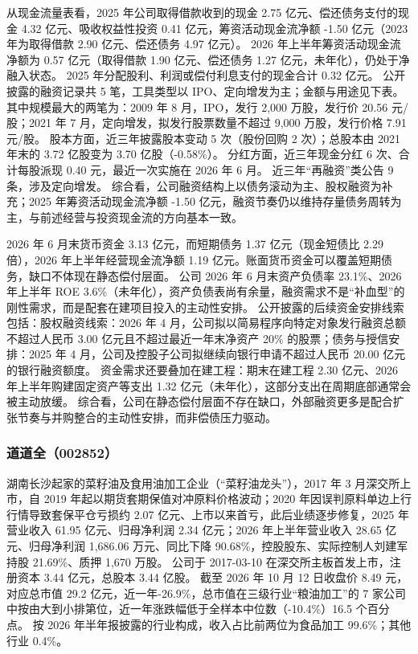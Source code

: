  从现金流量表看，2025 年公司取得借款收到的现金 2.75 亿元、偿还债务支付的现金 4.32 亿元、吸收权益性投资 0.41 亿元，筹资活动现金流净额 -1.50 亿元（2023 年为取得借款 2.90 亿元、偿还债务 4.97 亿元）。 2026 年上半年筹资活动现金流净额为 0.57 亿元（取得借款 1.90 亿元、偿还债务 1.27 亿元，未年化），仍处于净融入状态。 2025 年分配股利、利润或偿付利息支付的现金合计 0.32 亿元。 公开披露的融资记录共 5 笔，工具类型以 IPO、定向增发为主；金额与用途见下表。 其中规模最大的两笔为：2009 年 8 月，IPO，发行 2,000 万股，发行价 20.56 元/股；2021 年 7 月，定向增发，拟发行股票数量不超过 9,000 万股，发行价格 7.91 元/股。 股本方面，近三年披露股本变动 5 次（股份回购 2 次）；总股本由 2021 年末的 3.72 亿股变为 3.70 亿股（-0.58\%）。 分红方面，近三年现金分红 6 次、合计每股派现 0.40 元，最近一次实施在 2026 年 6 月。 近三年“再融资”类公告 9 条，涉及定向增发。 综合看，公司融资结构上以债务滚动为主、股权融资为补充；2025 年筹资活动现金流净额 -1.50 亿元，融资节奏仍以维持存量债务周转为主，与前述经营与投资现金流的方向基本一致。

 2026 年 6 月末货币资金 3.13 亿元，而短期债务 1.37 亿元（现金短债比 2.29 倍），2026 年上半年经营现金流净额 1.19 亿元。账面货币资金可以覆盖短期债务，缺口不体现在静态偿付层面。 公司 2026 年 6 月末资产负债率 23.1\%、2026 年上半年 ROE 3.6\%（未年化），资产负债表尚有余量，融资需求不是“补血型”的刚性需求，而是配套在建项目投入的主动性安排。 公开披露的后续资金安排线索包括：股权融资线索：2026 年 4 月，公司拟以简易程序向特定对象发行融资总额不超过人民币 3.00 亿元且不超过最近一年末净资产 20\% 的股票；债务与授信安排：2025 年 4 月，公司及控股子公司拟继续向银行申请不超过人民币 20.00 亿元的银行融资额度。 资金需求还要叠加在建工程：期末在建工程 2.30 亿元、2026 年上半年购建固定资产等支出 1.32 亿元（未年化），这部分支出在周期底部通常会被主动放缓。 综合看，公司在静态偿付层面不存在缺口，外部融资更多是配合扩张节奏与并购整合的主动性安排，而非偿债压力驱动。




\subsubsection{道道全（002852）}
\label{co:002852}

 湖南长沙起家的菜籽油及食用油加工企业（“菜籽油龙头”），2017 年 3 月深交所上市，自 2019 年起以期货套期保值对冲原料价格波动；2020 年因误判原料单边上行行情导致套保平仓亏损约 2.07 亿元、上市以来首亏，此后业绩逐步修复，2025 年营业收入 61.95 亿元、归母净利润 2.34 亿元；2026 年上半年营业收入 28.65 亿元、归母净利润 1,686.06 万元、同比下降 90.68\%，控股股东、实际控制人刘建军持股 21.69\%、质押 1,670 万股。 公司于 2017-03-10 在深交所主板首发上市，注册资本 3.44 亿元，总股本 3.44 亿股。 截至 2026 年 10 月 12 日收盘价 8.49 元，对应总市值 29.2 亿元，近一年-26.9\%，总市值在三级行业“粮油加工”的 7 家公司中按由大到小排第位，近一年涨跌幅低于全样本中位数（-10.4\%）16.5 个百分点。 按 2026 年半年报披露的行业构成，收入占比前两位为食品加工 99.6\%；其他行业 0.4\%。

